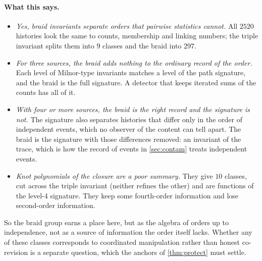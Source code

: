 \documentclass[11pt]{article}
\theoremstyle{definition}\newtheorem{definition}[theorem]{Definition}\newtheorem{remark}[theorem]{Remark}\newtheorem{example}[theorem]{Example}\newtheorem{problem}[theorem]{Open problem}\crefname{problem}{Problem}{Problems}
\begin{document}
\paragraph{What this says.}
\begin{itemize}
\item \emph{Yes, braid invariants separate orders that pairwise statistics cannot.} All $2520$ histories look the same to counts, membership and linking numbers; the triple invariant splits them into $9$ classes and the braid into $297$.
\item \emph{For three sources, the braid adds nothing to the ordinary record of the order.} Each level of Milnor-type invariants matches a level of the path signature, and the braid is the full signature. A detector that keeps iterated sums of the counts has all of it.
\item \emph{With four or more sources, the braid is the right record and the signature is not.} The signature also separates histories that differ only in the order of independent events, which no observer of the content can tell apart. The braid is the signature with those differences removed: an invariant of the trace, which is how the record of events in \cref{sec:contam} treats independent events.
\item \emph{Knot polynomials of the closure are a poor summary.} They give $10$ classes, cut across the triple invariant (neither refines the other) and are functions of the level-4 signature. They keep some fourth-order information and lose second-order information.
\end{itemize}
So the braid group earns a place here, but as the algebra of orders up to independence, not as a source of information the order itself lacks. Whether any of these classes corresponds to coordinated manipulation rather than honest co-revision is a separate question, which the anchors of \cref{thm:protect} must settle.
\end{document}
